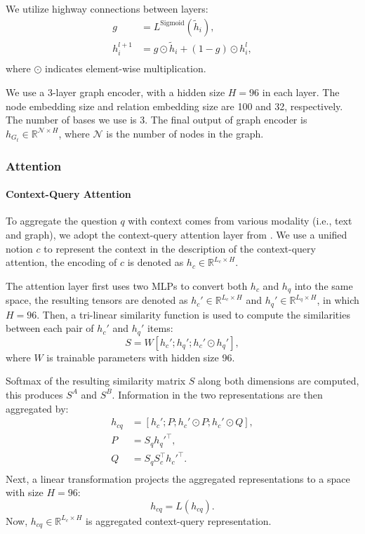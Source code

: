 \documentclass[11pt]{article}
\begin{document}
We utilize highway connections \citep{srivastava15highway} between layers:
\begin{equation}
\begin{aligned}
    g &= L^{\mathrm{Sigmoid}}(\tilde{h}_i), \\
    h^{l+1}_i &= g \odot \tilde{h}_i + (1 - g) \odot h^{l}_i, \\
\end{aligned}
\end{equation}
where $\odot$ indicates element-wise multiplication.

We use a 3-layer graph encoder, with a hidden size $H=96$ in each layer.
The node embedding size and relation embedding size are 100 and 32, respectively.
The number of bases we use is 3.
The final output of graph encoder is $h_{G_t} \in \mathbb{R}^{\mathcal{N} \times H}$, where $\mathcal{N}$ is the number of nodes in the graph.

\subsubsection{Attention}

\paragraph{Context-Query Attention}
To aggregate the question $q$ with context comes from various modality (i.e., text and graph), we adopt the context-query attention layer from \citep{yu18qanet}.
We use a unified notion $c$ to represent the context in the description of the context-query attention, the encoding of $c$ is denoted as $h_c \in \mathbb{R}^{L_c \times H}$.

The attention layer first uses two MLPs to convert both $h_c$ and $h_q$ into the same space, the resulting tensors are denoted as $h_c' \in \mathbb{R}^{L_c \times H}$ and $h_q' \in \mathbb{R}^{L_q \times H}$, in which $H = 96$.
Then, a tri-linear similarity function is used to compute the similarities between each pair of $h_c'$ and $h_q'$ items: 
\begin{equation}
    S = W[h_c'; h_q'; h_c' \odot h_q'],
\end{equation}
where $W$ is trainable parameters with hidden size 96.

Softmax of the resulting similarity matrix $S$ along both dimensions are computed, this produces $S^A$ and $S^B$. 
Information in the two representations are then aggregated by:
\begin{equation}
\begin{aligned}
    h_{cq} &= [h_c'; P; h_c'\odot P; h_c' \odot Q], \\
    P &= S_q h_q'^{\top}, \\
    Q &= S_q S_c^{\top} h_c'^{\top}. \\
\end{aligned}
\end{equation}
Next, a linear transformation projects the aggregated representations to a space with size $H=96$:
\begin{equation}
    h_{cq} = L(h_{cq}).
\end{equation}
Now, $h_{cq} \in \mathbb{R}^{L_c \times H}$ is aggregated context-query representation.
\end{document}
